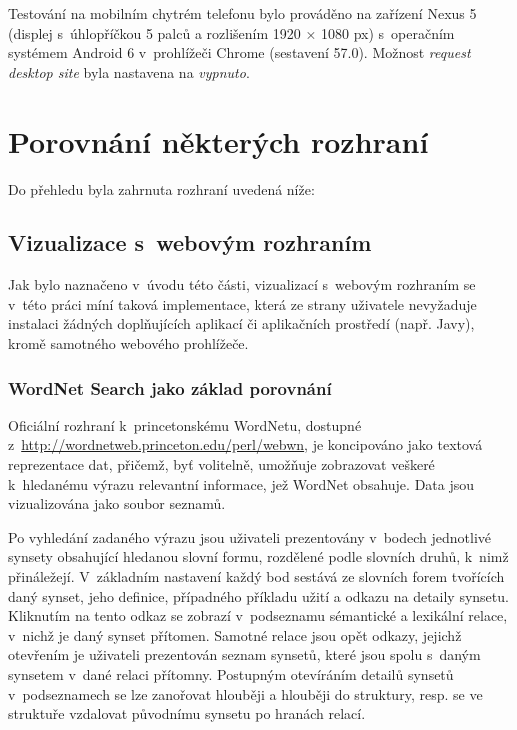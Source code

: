 \documentclass[a4paper, 11pt, oneside, showtrims]{book}
\begin{document}
				Testování na mobilním chytrém telefonu bylo prováděno na zařízení Nexus 5 (displej s~úhlopříčkou 5 palců a rozlišením 1920 × 1080 px) s~operačním systémem Android 6 v~prohlížeči Chrome (sestavení 57.0). Možnost \textit{request desktop site} byla nastavena na \textit{vypnuto}.

		\chapter{Porovnání některých rozhraní}
		\label{cha:porovnani}
			
			Do přehledu byla zahrnuta rozhraní uvedená níže:

			\minitoc %

			

			\section{Vizualizace s~webovým rozhraním}

				Jak bylo naznačeno v~úvodu této části, vizualizací s~webovým rozhraním se v~této práci míní taková implementace, která ze strany uživatele nevyžaduje instalaci žádných doplňujících aplikací či aplikačních prostředí (např. Javy), kromě samotného webového prohlížeče.

				\subsection{WordNet Search jako základ porovnání}
				\label{wnvis:wnsearch}

					Oficiální rozhraní k~princetonskému WordNetu, dostupné z~\url{http://wordnetweb.princeton.edu/perl/webwn}, je koncipováno jako textová reprezentace dat, přičemž, byť volitelně, umožňuje zobrazovat veškeré k~hledanému výrazu relevantní informace, jež WordNet obsahuje. Data jsou vizualizována jako soubor seznamů.

					Po vyhledání zadaného výrazu jsou uživateli prezentovány v~bodech jednotlivé synsety obsahující hledanou slovní formu, rozdělené podle slovních druhů, k~nimž přináležejí. V~základním nastavení každý bod sestává ze slovních forem tvořících daný synset, jeho definice, případného příkladu užití a odkazu na detaily synsetu. Kliknutím na tento odkaz se zobrazí v~podseznamu sémantické a lexikální relace, v~nichž je daný synset přítomen. Samotné relace jsou opět odkazy, jejichž otevřením je uživateli prezentován seznam synsetů, které jsou spolu s~daným synsetem v~dané relaci přítomny. Postupným otevíráním detailů synsetů v~podseznamech se lze zanořovat hlouběji a hlouběji do struktury, resp. se ve struktuře vzdalovat původnímu synsetu po hranách relací.
\end{document}
